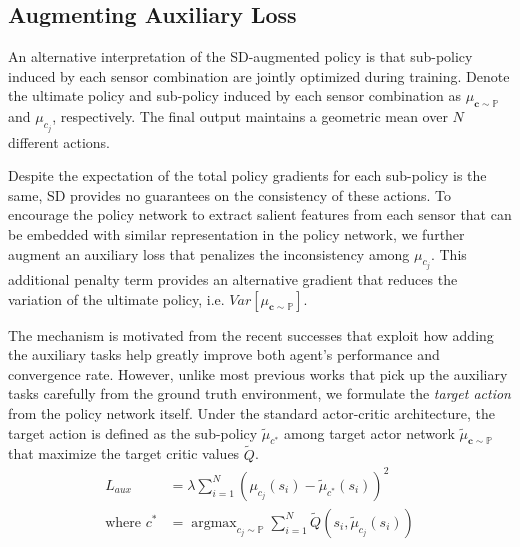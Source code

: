 \documentclass[../thesis.tex]{subfiles}
\begin{document}
\subsection{Augmenting Auxiliary Loss}

An alternative interpretation of the SD-augmented policy is that sub-policy induced by each sensor combination are jointly optimized during training. Denote the ultimate policy and sub-policy induced by each sensor combination as $\mu_{\mathbf{c}\sim \mathbb{P}}$ and $\mu_{c_j}$, respectively. The final output maintains a geometric mean over $N$ different actions. 

Despite the expectation of the total policy gradients for each sub-policy is the same, SD provides no guarantees on the consistency of these actions. 
To encourage the policy network to extract salient features from each sensor that can be embedded with similar representation in the policy network, we further augment an auxiliary loss that penalizes the inconsistency among $\mu_{c_j}$. 
This additional penalty term provides an alternative gradient that reduces the variation of the ultimate policy, i.e. $Var \left[ \mu_{\mathbf{c}\sim \mathbb{P}} \right]$.

The mechanism is motivated from the recent successes \cite{DBLP:journals/corr/GuLGTL16,mirowski2017a,lample2016playing,dosovitskiy2016learning} that exploit how adding the auxiliary tasks help greatly improve both agent's performance and convergence rate. However, unlike most previous works that pick up the auxiliary tasks carefully from the ground truth environment, we formulate the \textit{target action} from the policy network itself. 
Under the standard actor-critic architecture, the target action is defined as the sub-policy $\tilde{\mu}_{c^{*}}$ among target actor network $\tilde{\mu}_{\mathbf{c}\sim \mathbb{P}}$ that maximize the target critic values $\tilde{Q}$.
\begin{align}
L_{aux} &= \lambda \sum_{i=1}^N (\mu_{c_j}(s_i)-\tilde{\mu}_{c^{*}}(s_i))^2 \\
\text{where  } c^{*} &= \mathop{\mathrm{argmax}}_{c_j \sim \mathbb{P}} \sum_{i=1}^N \tilde{Q}(s_i,\tilde{\mu}_{c_j}(s_i))
\end{align}
\end{document}
